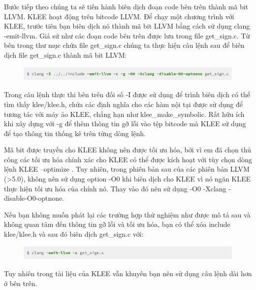 \documentclass[12pt,a4paper]{report}
\begin{document}
Bước tiếp theo chúng ta sẽ tiến hành biên dịch đoạn code bên trên thành mã bit LLVM. KLEE hoạt động trên bitcode LLVM. Để chạy một chương trình với KLEE, trước tiên bạn biên dịch nó thành mã bit LLVM bằng cách sử dụng clang -emit-llvm. Giả sử như các đoạn code bên trên được lưu trong file get\_sign.c. Từ bên trong thư mục chứa file get\_sign.c chúng ta thực hiện câu lệnh sau để biên dịch file get\_sign.c thành mã bit LLVM:

\begin{figure}[ht]
\begin{center}
\includegraphics[scale=.3]{hinhanh/clangcompiling.png}
\end{center}
\end{figure}

Trong câu lệnh thực thi bên trên đối số -I được sử dụng để trình biên dịch có thể tìm thấy klee/klee.h, chứa các định nghĩa cho các hàm nội tại được sử dụng để tương tác với máy ảo KLEE, chẳng hạn như klee\_make\_symbolic. Rất hữu ích khi xây dựng với -g để thêm thông tin gỡ lỗi vào tệp bitcode mà KLEE sử dụng để tạo thông tin thống kê trên từng dòng lệnh.

Mã bit được truyền cho KLEE không nên được tối ưu hóa, bởi vì em đã chọn thủ công các tối ưu hóa chính xác cho KLEE có thể được kích hoạt với tùy chọn dòng lệnh KLEE --optimize . Tuy nhiên, trong phiên bản sau của các phiên bản LLVM (>5.0), không nên sử dụng option -O0 khi biên dịch cho KLEE vì nó ngăn KLEE thực hiện tối ưu hóa của chính nó. Thay vào đó nên sử dụng -O0 -Xclang -disable-O0-optnone.

Nếu bạn không muốn phát lại các trường hợp thử nghiệm như được mô tả sau và không quan tâm đến thông tin gỡ lỗi và tối ưu hóa, bạn có thể xóa include klee/klee.h và sau đó biên dịch get\_sign.c với:

\begin{figure}[ht]
\begin{center}
\includegraphics[scale=.3]{hinhanh/clangCompilingshort.png}
\end{center}
\end{figure}

Tuy nhiên trong tài liệu của KLEE vẫn khuyên bạn nên sử dụng câu lệnh dài hơn ở bên trên.
\end{document}
